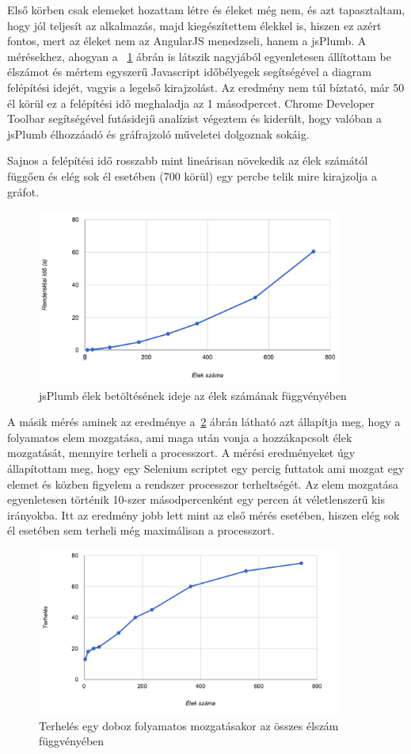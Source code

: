 Első körben csak elemeket hozattam létre és éleket még nem, és azt tapasztaltam, hogy jól teljesít az alkalmazás, majd kiegészítettem élekkel is, hiszen ez azért fontos, mert az éleket nem az AngularJS menedzseli, hanem a jsPlumb. A mérésekhez, ahogyan a ~\ref{fig:plumb} ábrán is látszik nagyjából egyenletesen állítottam be élszámot és mértem egyszerű Javascript időbélyegek segítségével a diagram felépítési idejét, vagyis a legelső kirajzolást. Az eredmény nem túl bíztató, már 50 él körül ez a felépítési idő meghaladja az 1 másodpercet. Chrome Developer Toolbar segítségével futásidejű analízist végeztem és kiderült, hogy valóban a jsPlumb élhozzáadó és gráfrajzoló műveletei dolgoznak sokáig. 

Sajnos a felépítési idő rosszabb mint lineárisan növekedik az élek számától függően és elég sok él esetében (700 körül) egy percbe telik mire kirajzolja a gráfot.  


\begin{figure}[!ht]
\centering
\includegraphics[width=10cm,keepaspectratio]{figures/plumb.png}
\caption{jsPlumb élek betöltésének ideje az élek számának függvényében}
\label{fig:plumb}
\end{figure}

A másik mérés aminek az eredménye a~\ref{fig:plumb2} ábrán látható azt állapítja meg, hogy a folyamatos elem mozgatása, ami maga után vonja a hozzákapcsolt élek mozgatását, mennyire terheli a processzort. A mérési eredményeket úgy állapítottam meg, hogy egy Selenium scriptet egy percig futtatok ami mozgat egy elemet és közben figyelem a rendszer processzor terheltségét. Az elem mozgatása egyenletesen történik 10-szer másodpercenként egy percen át véletlenszerű kis irányokba. Itt az eredmény jobb lett mint az első mérés esetében, hiszen elég sok él esetében sem terheli még maximálisan a processzort. 

\begin{figure}[!ht]
\centering
\includegraphics[width=10cm,keepaspectratio]{figures/plumb2.png}
\caption{Terhelés egy doboz folyamatos mozgatásakor az összes élszám függvényében}
\label{fig:plumb2}
\end{figure}

